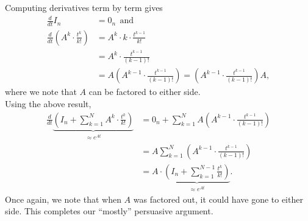 Computing derivatives term by term gives
\begin{align*}
    \frac{d}{dt} I_n & = 0_n~~\text{and} \\[1em]
    \frac{d}{dt} \left(A^{k} \cdot \frac{t^{k}}{k!} \right)& = A^{k} \cdot k \cdot  \frac{t^{k-1}}{k!} \\
    & =  A^{k} \cdot \frac{t^{k-1}}{(k-1)!} \\
    &= A \left( A^{k-1} \cdot \frac{t^{k-1}}{(k-1)!}\right) =   \left( A^{k-1} \cdot \frac{t^{k-1}}{(k-1)!}\right) A,
\end{align*}
where we note that $A$ can be factored to either side. \\

Using the above result, 
\begin{align*}
    \frac{d}{dt} \underbrace{\left( I_n + \sum_{k=1}^N A^{k} \cdot \frac{t^{k}}{k!} \right)}_{\approx e^{At}} & = 0_n +  \sum_{k=1}^N A \left( A^{k-1} \cdot \frac{t^{k-1}}{(k-1)!} \right) \\[1em]
    & = A \sum_{k=1}^N  \left( A^{k-1} \cdot \frac{t^{k-1}}{(k-1)!} \right)\\[1em]
    &= A \cdot \underbrace{\left( I_n + \sum_{k=1}^{N-1}  \frac{t^{k}}{k!} \right)}_{\approx e^{At}}.
\end{align*}
Once again, we note that when $A$ was factored out, it could have gone to either side. This completes our ``mostly'' persuasive argument.\\

